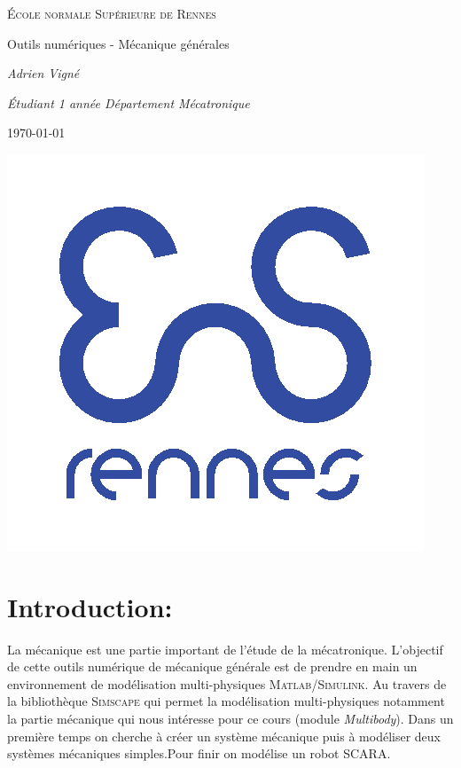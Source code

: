 \documentclass[12pt,a4paper]{article}
\begin{document}
\begin{titlepage}
\centering
{\scshape \LARGE École normale Supérieure de Rennes \par}
\vspace{1cm}
{\huge \LARGE  Outils numériques - Mécanique générales \par}
\vspace{1cm}
{\LARGE \itshape Adrien Vigné \par}
\vspace{1cm}
{\LARGE \itshape Étudiant 1 année Département Mécatronique \par}
\vspace{1cm}
{\LARGE \today \par}
\vspace{5cm}
\includegraphics[scale=0.5]{ENS.png}

\end{titlepage}

\tableofcontents

\newpage

\part*{Introduction:} 
La mécanique est une partie important de l'étude de la mécatronique. L'objectif de cette outils numérique de mécanique générale est de prendre en main un environnement de modélisation multi-physiques \textsc{Matlab/Simulink}. Au travers de la bibliothèque \textsc{Simscape} qui permet la modélisation multi-physiques notamment la partie mécanique qui nous intéresse pour ce cours (module \textit{Multibody}). Dans un première temps on cherche à créer un système mécanique puis à modéliser deux systèmes mécaniques simples.Pour finir on modélise un robot SCARA.
\end{document}
